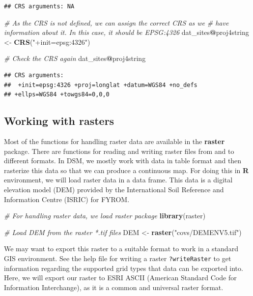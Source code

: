 \documentclass[10pt,b5paper,]{book}
\newenvironment{Shaded}{\begin{snugshade}}{\end{snugshade}}
\newcommand{\CommentTok}[1]{\textcolor[rgb]{0.56,0.35,0.01}{\textit{#1}}}
\newcommand{\KeywordTok}[1]{\textcolor[rgb]{0.13,0.29,0.53}{\textbf{#1}}}
\newcommand{\NormalTok}[1]{#1}
\newcommand{\OperatorTok}[1]{\textcolor[rgb]{0.81,0.36,0.00}{\textbf{#1}}}
\newcommand{\StringTok}[1]{\textcolor[rgb]{0.31,0.60,0.02}{#1}}
\theoremstyle{definition}
\theoremstyle{definition}
\theoremstyle{definition}
\theoremstyle{remark}
\begin{document}
\begin{verbatim}
## CRS arguments: NA
\end{verbatim}

\begin{Shaded}
\begin{Highlighting}[]
\CommentTok{# As the CRS is not defined, we can assign the correct CRS as we}
\CommentTok{# have information about it. In this case, it should be EPSG:4326}
\NormalTok{dat_sites}\OperatorTok{@}\NormalTok{proj4string <-}\StringTok{ }\KeywordTok{CRS}\NormalTok{(}\StringTok{"+init=epsg:4326"}\NormalTok{)}

\CommentTok{# Check the CRS again}
\NormalTok{dat_sites}\OperatorTok{@}\NormalTok{proj4string}
\end{Highlighting}
\end{Shaded}

\begin{verbatim}
## CRS arguments:
##  +init=epsg:4326 +proj=longlat +datum=WGS84 +no_defs
## +ellps=WGS84 +towgs84=0,0,0
\end{verbatim}

\hypertarget{working-with-rasters}{%
\subsection{Working with rasters}\label{working-with-rasters}}

Most of the functions for handling raster data are available in the
\textbf{raster} package. There are functions for reading and writing
raster files from and to different formats. In DSM, we mostly work with
data in table format and then rasterize this data so that we can produce
a continuous map. For doing this in \textbf{R} environment, we will load
raster data in a data frame. This data is a digital elevation model
(DEM) provided by the International Soil Reference and Information
Centre (ISRIC) for FYROM.

\begin{Shaded}
\begin{Highlighting}[]
\CommentTok{# For handling raster data, we load raster package}
\KeywordTok{library}\NormalTok{(raster)}

\CommentTok{# Load DEM from the raster *.tif files}
\NormalTok{DEM <-}\StringTok{ }\KeywordTok{raster}\NormalTok{(}\StringTok{"covs/DEMENV5.tif"}\NormalTok{)}
\end{Highlighting}
\end{Shaded}

We may want to export this raster to a suitable format to work in a
standard GIS environment. See the help file for writing a raster
\texttt{?writeRaster} to get information regarding the supported grid
types that data can be exported into. Here, we will export our raster to
ESRI ASCII (American Standard Code for Information Interchange), as it
is a common and universal raster format.
\end{document}
